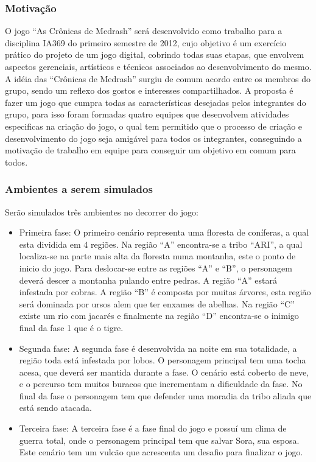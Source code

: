 \subsubsection{Motivação}

O jogo ``As Crônicas de Medrash'' será desenvolvido como trabalho para
 a disciplina IA369 do primeiro semestre de 2012, cujo objetivo é um exercício 
prático do projeto de um jogo digital, cobrindo todas suas etapas, que envolvem 
aspectos gerenciais, artísticos e técnicos associados ao desenvolvimento do mesmo.
A idéia das ``Crônicas de Medrash'' surgiu de comum acordo entre os membros
 do grupo, sendo um reflexo dos gostos e interesses compartilhados. A proposta 
é fazer um jogo que cumpra todas as características desejadas pelos integrantes 
do grupo, para isso foram formadas quatro equipes que desenvolvem atividades 
especificas na criação do jogo, o qual tem permitido que o processo de criação e 
desenvolvimento do jogo seja amigável para todos os integrantes, conseguindo 
a motivação de trabalho em equipe para conseguir um objetivo em comum para todos.

\subsubsection{Ambientes a serem simulados}
Serão simulados três ambientes no decorrer do jogo:

\begin{itemize}
\item Primeira fase: 
O primeiro cenário representa uma floresta de coníferas, a qual esta dividida em 
4 regiões. Na região ``A'' encontra-se a tribo ``ARI'', a qual localiza-se na parte mais alta
 da floresta numa montanha, este o ponto de inicio do jogo. Para deslocar-se entre
 as regiões ``A'' e ``B'', o personagem deverá descer a montanha pulando entre pedras.
 A região ``A'' estará infestada por cobras. A região ``B'' é composta por muitas árvores,
 esta região será dominada por ursos alem que ter enxames de abelhas. Na região ``C'' 
existe um rio com jacarés e finalmente na região ``D'' encontra-se o inimigo final da fase 1 
que é o tigre.

\item Segunda fase: 
A segunda fase é desenvolvida na noite em sua totalidade, a região toda está infestada 
por lobos. O personagem principal tem uma tocha acesa, que deverá ser mantida durante a fase.
 O cenário está coberto de neve, e o percurso tem muitos buracos que incrementam 
a dificuldade da fase. No final da fase o personagem tem que defender uma moradia 
da tribo aliada que está sendo atacada.

\item Terceira fase: 
A terceira fase é a fase final do jogo e possuí um clima de guerra total,
 onde o personagem principal tem que salvar Sora, sua esposa. Este cenário tem 
um vulcão que acrescenta um desafio para finalizar o jogo. 
\end{itemize}



